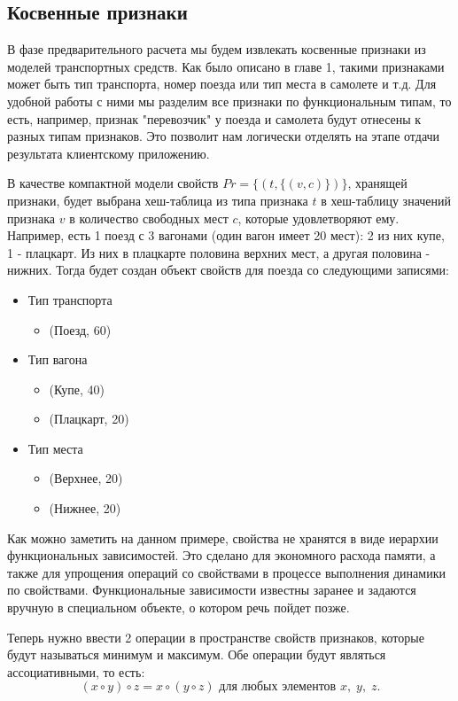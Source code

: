 \subsection{Косвенные признаки}
В фазе предварительного расчета мы будем извлекать косвенные признаки из моделей транспортных средств. Как было описано в главе 1, такими признаками может быть тип транспорта, номер поезда или тип места в самолете и т.д. Для удобной работы с ними мы разделим все признаки по функциональным типам, то есть, например, признак "перевозчик" у поезда и самолета будут отнесены к разных типам признаков. Это позволит нам логически отделять на этапе отдачи результата клиентскому приложению.

В качестве компактной модели свойств $Pr=\{(t,\{(v, c)\})\}$, хранящей признаки, будет выбрана хеш-таблица из типа признака $t$ в хеш-таблицу значений признака $v$ в количество свободных мест $c$, которые удовлетворяют ему. Например, есть 1 поезд с 3 вагонами (один вагон имеет 20 мест): 2 из них купе, 1 - плацкарт. Из них в плацкарте половина верхних мест, а другая половина - нижних. Тогда будет создан объект свойств для поезда со следующими записями:
\begin{itemize}
	\item Тип транспорта
	\begin{itemize}
		\item (Поезд, 60)
	\end{itemize}
	\item Тип вагона
	\begin{itemize}
		\item (Купе, 40)
		\item (Плацкарт, 20)
	\end{itemize}
	\item Тип места
	\begin{itemize}
		\item (Верхнее, 20)
		\item (Нижнее, 20)
	\end{itemize}
\end{itemize}

Как можно заметить на данном примере, свойства не хранятся в виде иерархии функциональных зависимостей. Это сделано для экономного расхода памяти, а также для упрощения операций со свойствами в процессе выполнения динамики по свойствами. Функциональные зависимости известны заранее и задаются вручную в специальном объекте, о котором речь пойдет позже.

Теперь нужно ввести 2 операции в пространстве свойств признаков, которые будут называться минимум и максимум. Обе операции будут являться ассоциативными, то есть:
\[
(x\circ y)\circ z=x\circ(y\circ z)\text{ для любых элементов }x,\;y,\;z.
\]

